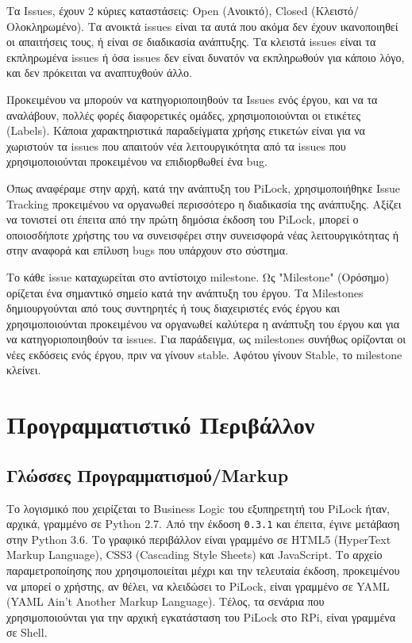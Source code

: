 		Τα Issues, έχουν 2 κύριες καταστάσεις: Open (Ανοικτό), Closed (Κλειστό/Ολοκληρωμένο). Τα ανοικτά issues είναι τα αυτά που ακόμα δεν έχουν ικανοποιηθεί οι απαιτήσεις τους, ή είναι σε διαδικασία ανάπτυξης. Τα κλειστά issues είναι τα εκπληρωμένα issues ή όσα issues δεν είναι δυνατόν να εκπληρωθούν για κάποιο λόγο, και δεν πρόκειται να αναπτυχθούν άλλο.

		Προκειμένου να μπορούν να κατηγοριοποιηθούν τα Issues ενός έργου, και να τα αναλάβουν, πολλές φορές διαφορετικές ομάδες, χρησιμοποιούνται οι ετικέτες (Labels). Κάποια χαρακτηριστικά παραδείγματα χρήσης ετικετών είναι για να χωριστούν τα issues που απαιτούν νέα λειτουργικότητα από τα issues που χρησιμοποιούνται προκειμένου να επιδιορθωθεί ένα bug.

		Όπως αναφέραμε στην αρχή, κατά την ανάπτυξη του PiLock, χρησιμοποιήθηκε Issue Tracking προκειμένου να οργανωθεί περισσότερο η διαδικασία της ανάπτυξης. Αξίζει να τονιστεί οτι έπειτα από την πρώτη δημόσια έκδοση του PiLock, μπορεί ο οποιοσδήποτε χρήστης του να συνεισφέρει στην συνεισφορά νέας λειτουργικότητας ή στην αναφορά και επίλυση bugs που υπάρχουν στο σύστημα.

		Το κάθε issue καταχωρείται στο αντίστοιχο milestone. Ως "Milestone" (Ορόσημο) ορίζεται ένα σημαντικό σημείο κατά την ανάπτυξη του έργου. Τα Milestones δημιουργούνται από τους συντηρητές ή τους διαχειριστές ενός έργου και χρησιμοποιούνται προκειμένου να οργανωθεί καλύτερα η ανάπτυξη του έργου και για να κατηγοριοποιηθούν τα issues. Για παράδειγμα, ως milestones συνήθως ορίζονται οι νέες εκδόσεις ενός έργου, πριν να γίνουν stable. Αφότου γίνουν Stable, το milestone κλείνει.

\section{Προγραμματιστικό Περιβάλλον}
	\subsection{Γλώσσες Προγραμματισμού/Markup}
		Το λογισμικό που χειρίζεται το Business Logic του εξυπηρετητή του PiLock ήταν, αρχικά, γραμμένο σε Python 2.7. Από την έκδοση \verb|0.3.1| και έπειτα, έγινε μετάβαση στην Python 3.6. Το γραφικό περιβάλλον είναι γραμμένο σε HTML5 (HyperText Markup Language), CSS3 (Cascading Style Sheets) και JavaScript. Το αρχείο παραμετροποίησης που χρησιμοποιείται μέχρι και την τελευταία έκδοση, προκειμένου να μπορεί ο χρήστης, αν θέλει, να κλειδώσει το PiLock, είναι γραμμένο σε YAML (YAML Ain't Another Markup Language). Τέλος, τα σενάρια που χρησιμοποιούνται για την αρχική εγκατάσταση του PiLock στο RPi, είναι γραμμένα σε Shell.

